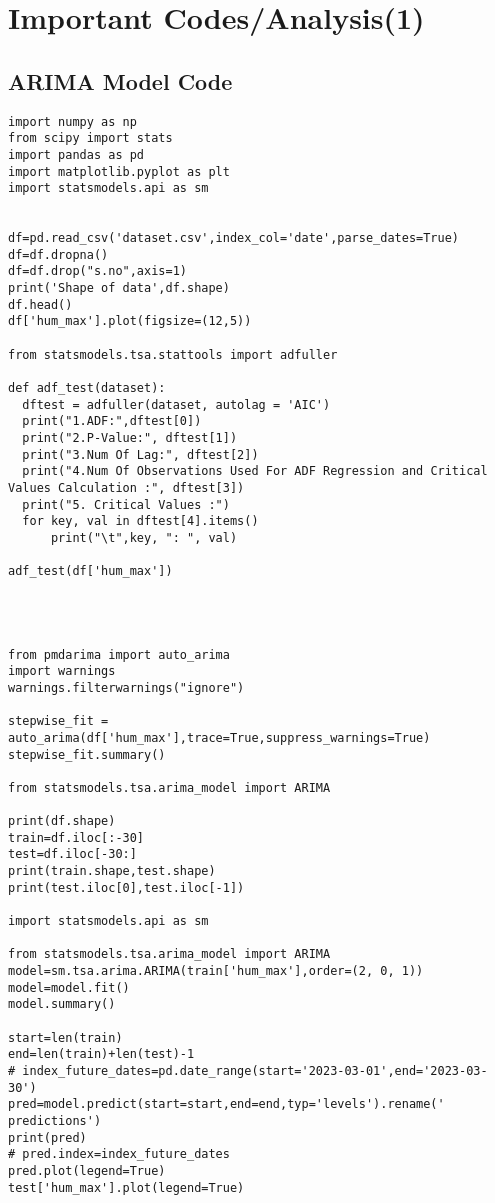 \chapter{Important Codes/Analysis(1)}
\section{ARIMA Model Code}
\lstset{language=Python}
\lstset{frame=lines}
\lstset{basicstyle=\footnotesize}
\begin{lstlisting}
import numpy as np
from scipy import stats
import pandas as pd
import matplotlib.pyplot as plt
import statsmodels.api as sm


df=pd.read_csv('dataset.csv',index_col='date',parse_dates=True)
df=df.dropna()
df=df.drop("s.no",axis=1)
print('Shape of data',df.shape)
df.head()
df['hum_max'].plot(figsize=(12,5))

from statsmodels.tsa.stattools import adfuller

def adf_test(dataset):
  dftest = adfuller(dataset, autolag = 'AIC')
  print("1.ADF:",dftest[0])
  print("2.P-Value:", dftest[1])
  print("3.Num Of Lag:", dftest[2])
  print("4.Num Of Observations Used For ADF Regression and Critical Values Calculation :", dftest[3])
  print("5. Critical Values :")
  for key, val in dftest[4].items()
      print("\t",key, ": ", val)

adf_test(df['hum_max'])




from pmdarima import auto_arima
import warnings
warnings.filterwarnings("ignore")

stepwise_fit = auto_arima(df['hum_max'],trace=True,suppress_warnings=True)          
stepwise_fit.summary()

from statsmodels.tsa.arima_model import ARIMA

print(df.shape)
train=df.iloc[:-30]
test=df.iloc[-30:]
print(train.shape,test.shape)
print(test.iloc[0],test.iloc[-1])

import statsmodels.api as sm

from statsmodels.tsa.arima_model import ARIMA
model=sm.tsa.arima.ARIMA(train['hum_max'],order=(2, 0, 1))
model=model.fit()
model.summary()

start=len(train)
end=len(train)+len(test)-1
# index_future_dates=pd.date_range(start='2023-03-01',end='2023-03-30')
pred=model.predict(start=start,end=end,typ='levels').rename(' predictions')
print(pred)
# pred.index=index_future_dates
pred.plot(legend=True)
test['hum_max'].plot(legend=True)


\end{lstlisting}
